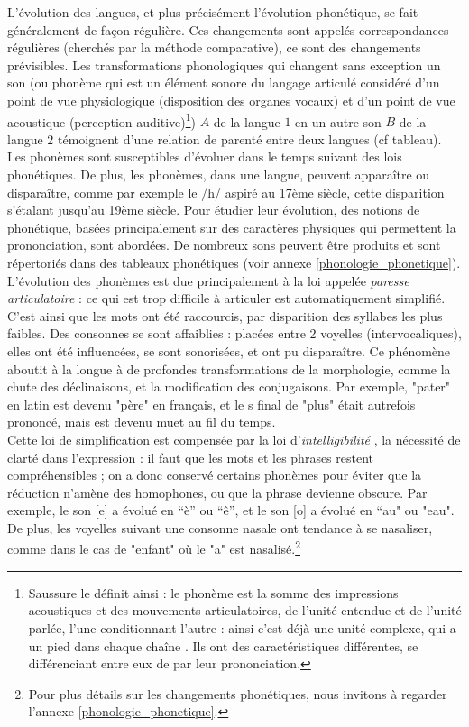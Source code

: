 \documentclass[12pt, twoside]{report}
\begin{document}
L'évolution des langues, et plus précisément l'évolution phonétique, se fait généralement de façon régulière. Ces changements sont appelés correspondances régulières (cherchés par la méthode comparative), ce sont des changements prévisibles. Les transformations phonologiques qui changent sans exception un son (ou phonème qui est un élément sonore du langage articulé considéré d'un point de vue physiologique (disposition des organes vocaux) et d'un point de vue acoustique (perception auditive)\footnote{Saussure le définit ainsi : \og le phonème est la somme des impressions acoustiques et des mouvements articulatoires, de l'unité entendue et de l'unité parlée, l'une  conditionnant l'autre : ainsi c'est déjà une unité complexe, qui a un pied dans chaque chaîne \fg{} \autocite{saussure}. Ils ont des caractéristiques différentes, se différenciant entre eux de par leur prononciation.}) $A$ de la langue $1$ en un autre son $B$ de la langue $2$ témoignent d'une relation de parenté entre deux langues (cf tableau).\\
\indent Les phonèmes sont susceptibles d'évoluer dans le temps suivant des \og lois phonétiques\fg. De plus, les phonèmes, dans une langue, peuvent apparaître ou disparaître, comme par exemple le /h/ aspiré au 17ème siècle, cette disparition s'étalant jusqu'au 19ème siècle. Pour étudier leur évolution, des notions de phonétique, basées principalement sur des caractères physiques qui permettent la prononciation, sont abordées. De nombreux sons peuvent être produits et sont répertoriés dans des tableaux phonétiques \autocite{saussure} (voir annexe \ref{phonologie_phonetique}).\\
L'évolution des phonèmes est due principalement à la loi appelée \og \textit{paresse articulatoire} \fg{} : ce qui est trop difficile à articuler est automatiquement simplifié. C'est ainsi que les mots ont été raccourcis, par disparition des syllabes les plus faibles. Des consonnes se sont affaiblies : placées entre 2 voyelles (intervocaliques), elles ont été influencées, se sont sonorisées, et ont pu disparaître. Ce phénomène aboutit à la longue à de profondes transformations de la morphologie, comme la chute des déclinaisons, et la modification des conjugaisons. Par exemple, "pater" en latin est devenu "père" en français, et le \og s\fg{} final de "plus" était autrefois prononcé, mais est devenu muet au fil du temps.\\
\indent Cette loi de simplification est compensée par la loi d'\og \textit{intelligibilité} \fg, la nécessité de clarté dans l'expression : il faut que les mots et les phrases restent compréhensibles ; on a donc conservé certains phonèmes pour éviter que la réduction n'amène des homophones, ou que la phrase devienne obscure. Par exemple, le son [e] a évolué en “è” ou “ê”, et le son [o] a évolué en “au" ou "eau". De plus, les voyelles suivant une consonne nasale ont tendance à se nasaliser, comme dans le cas de "enfant" où le "a" est nasalisé.\footnote{Pour plus détails sur les changements phonétiques, nous invitons à regarder l'annexe \ref{phonologie_phonetique}.}\\
\end{document}
